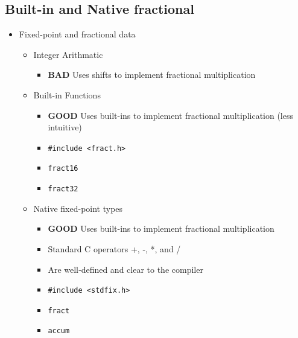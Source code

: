 \subsection{Built-in and Native fractional}
\begin{itemize}
	\item Fixed-point and fractional data
	\begin{itemize}
		\item Integer Arithmatic
		\begin{itemize}
			\item \textbf{BAD} Uses shifts to implement fractional multiplication
		\end{itemize}
		\newpage\item Built-in Functions
		\begin{itemize}
			\item \textbf{GOOD} Uses built-ins to implement fractional multiplication (less intuitive)
			\item \texttt{#include <fract.h>}
			\item \texttt{fract16}
			\item \texttt{fract32}
		\end{itemize}
		\item Native fixed-point types
		\begin{itemize}
			\item \textbf{GOOD} Uses built-ins to implement fractional multiplication
			\item Standard C operators +, ‐, *, and /
			\item Are well‐defined and clear to the compiler
			\item \texttt{#include <stdfix.h>}
			\item \texttt{fract}
			\item \texttt{accum}
		\end{itemize}
	\end{itemize}
\end{itemize}

